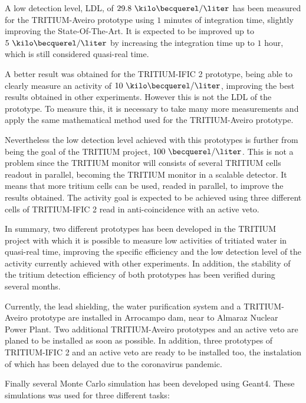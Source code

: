 A low detection level, LDL, of $29.8~\kilo\becquerel/\liter$ has been measured for the TRITIUM-Aveiro prototype using $1$ minutes of integration time, slightly improving the State-Of-The-Art. It is expected to be improved up to $5~\kilo\becquerel/\liter$ by increasing the integration time up to $1$ hour, which is still considered quasi-real time.

A better result was obtained for the TRITIUM-IFIC 2 prototype, being able to clearly measure an activity of $10~\kilo\becquerel/\liter$, improving the best results obtained in other experiments. However this is not the LDL of the prototype. To measure this, it is necessary to take many more measurements and apply the same mathematical method used for the TRITIUM-Aveiro prototype.

Nevertheless the low detection level achieved with this prototypes is further from being the goal of the TRITIUM project, $100~\becquerel/\liter$. This is not a problem since the TRITIUM monitor will consists of several TRITIUM cells readout in parallel, becoming the TRITIUM monitor in a scalable detector. It means that more tritium cells can be used, readed in parallel, to improve the results obtained. The activity goal is expected to be achieved using three different cells of TRITIUM-IFIC 2 read in anti-coincidence with an active veto.

In summary, two different prototypes has been developed in the TRITIUM project with which it is possible to measure low activities of tritiated water in quasi-real time, improving the specific efficiency and the low detection level of the activity currently achieved with other experiments. In addition, the stability of the tritium detection efficiency of both prototypes has been verified during several months.

Currently, the lead shielding, the water purification system and a TRITIUM-Aveiro prototype are installed in Arrocampo dam, near to Almaraz Nuclear Power Plant. Two additional TRITIUM-Aveiro prototypes and an active veto are planed to be installed as soon as possible. In addition, three prototypes of TRITIUM-IFIC 2 and an active veto are ready to be installed too, the instalation of which has been delayed due to the coronavirus pandemic.

Finally several Monte Carlo simulation has been developed using Geant4. These simulations was used for three different tasks:

